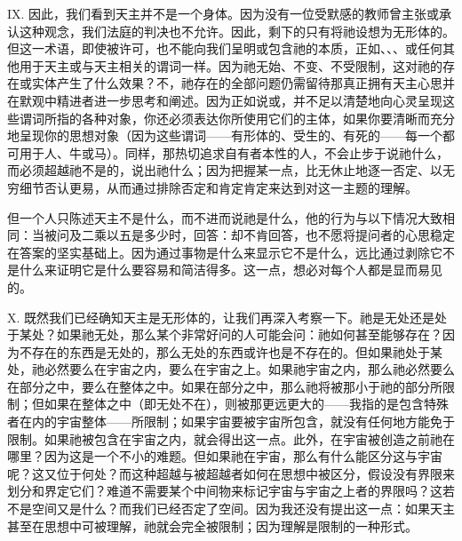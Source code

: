 IX. 因此，我们看到天主并不是一个身体。因为没有一位受默感的教师曾主张或承认这种观念，我们法庭的判决也不允许。因此，剩下的只有将祂设想为无形体的。但这一术语，即使被许可，也不能向我们呈明或包含祂的本质，正如、、、或任何其他用于天主或与天主相关的谓词一样。因为祂无始、不变、不受限制，这对祂的存在或实体产生了什么效果？不，祂存在的全部问题仍需留待那真正拥有天主心思并在默观中精进者进一步思考和阐述。因为正如说或，并不足以清楚地向心灵呈现这些谓词所指的各种对象，你还必须表达你所使用它们的主体，如果你要清晰而充分地呈现你的思想对象（因为这些谓词——有形体的、受生的、有死的——每一个都可用于人、牛或马）。同样，那热切追求自有者本性的人，不会止步于说祂什么，而必须超越祂不是的，说出祂什么；因为把握某一点，比无休止地逐一否定、以无穷细节否认更易，从而通过排除否定和肯定肯定来达到对这一主题的理解。\par

但一个人只陈述天主不是什么，而不进而说祂是什么，他的行为与以下情况大致相同：当被问及二乘以五是多少时，回答：却不肯回答，也不愿将提问者的心思稳定在答案的坚实基础上。因为通过事物是什么来显示它不是什么，远比通过剥除它不是什么来证明它是什么要容易和简洁得多。这一点，想必对每个人都是显而易见的。\par

X. 既然我们已经确知天主是无形体的，让我们再深入考察一下。祂是无处还是处于某处？如果祂无处，那么某个非常好问的人可能会问：祂如何甚至能够存在？因为不存在的东西是无处的，那么无处的东西或许也是不存在的。但如果祂处于某处，祂必然要么在宇宙之内，要么在宇宙之上。如果祂宇宙之内，那么祂必然要么在部分之中，要么在整体之中。如果在部分之中，那么祂将被那小于祂的部分所限制；但如果在整体之中（即无处不在），则被那更远更大的——我指的是包含特殊者在内的宇宙整体——所限制；如果宇宙要被宇宙所包含，就没有任何地方能免于限制。如果祂被包含在宇宙之内，就会得出这一点。此外，在宇宙被创造之前祂在哪里？因为这是一个不小的难题。但如果祂在宇宙，那么有什么能区分这与宇宙呢？这又位于何处？而这种超越与被超越者如何在思想中被区分，假设没有界限来划分和界定它们？难道不需要某个中间物来标记宇宙与宇宙之上者的界限吗？这若不是空间又是什么？而我们已经否定了空间。因为我还没有提出这一点：如果天主甚至在思想中可被理解，祂就会完全被限制；因为理解是限制的一种形式。\par

